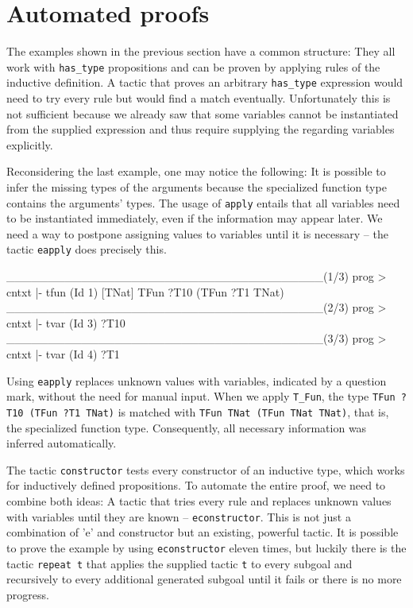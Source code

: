 \documentclass[paper = a4, fleqn, abstract=on, twoside]{scrreprt}
\newcommand{\coqinline}[1]{\texttt{#1}}
\begin{document}
\section{Automated proofs}
\label{autoproof}
The examples shown in the previous section have a common structure: They all work with \coqinline{has_type} propositions and can be proven by applying rules of the inductive definition. A tactic that proves an arbitrary \coqinline{has_type} expression would need to try every rule but would find a match eventually. Unfortunately this is not sufficient because we already saw that some variables cannot be instantiated from the supplied expression and thus require supplying the regarding variables explicitly.
\par
Reconsidering the last example, one may notice the following: It is possible to infer the missing types of the arguments because the specialized function type contains the arguments' types. The usage of \coqinline{apply} entails that all variables need to be instantiated immediately, even if the information may appear later. We need a way to postpone assigning values to variables until it is necessary -- the tactic \coqinline{eapply} does precisely this. 
\begin{coqcode}
______________________________________(1/3)
prog > cntxt |- tfun (Id 1) [TNat] \in TFun ?T10 (TFun ?T1 TNat)
______________________________________(2/3)
prog > cntxt |- tvar (Id 3) \in ?T10
______________________________________(3/3)
prog > cntxt |- tvar (Id 4) \in ?T1
\end{coqcode}
Using \coqinline{eapply} replaces unknown values with variables, indicated by a question mark, without the need for manual input. When we apply \coqinline{T_Fun}, the type \coqinline{TFun ?T10 (TFun ?T1 TNat)} is matched with \coqinline{TFun TNat (TFun TNat TNat)}, that is, the specialized function type. Consequently, all necessary information was inferred automatically.
\par
The tactic \coqinline{constructor} tests every constructor of an inductive type, which works for inductively defined propositions. To automate the entire proof, we need to combine both ideas: A tactic that tries every rule and replaces unknown values with variables until they are known -- \coqinline{econstructor}. This is not just a combination of 'e' and constructor but an existing, powerful tactic. It is possible to prove the example by using \coqinline{econstructor} eleven times, but luckily there is the tactic \coqinline{repeat t} that applies the supplied tactic \coqinline{t} to every subgoal and recursively to every additional generated subgoal until it fails or there is no more progress.
\end{document}
